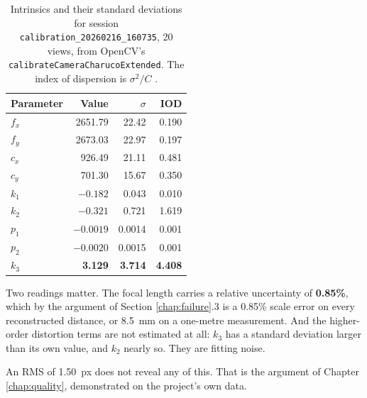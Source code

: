 \begin{table}[!ht]
\centering
\small
\caption[Measured parameter uncertainty on an archived session]{Intrinsics and their standard deviations for session \texttt{calibration\_20260216\_160735}, 20 views, from OpenCV's \texttt{calibrateCameraCharucoExtended}. The index of dispersion is $\sigma^2/C$ \cite{rojtberg2018pose}.}
\label{tab:measured-uncertainty}
\begin{tabular}{lrrr}
\toprule
\textbf{Parameter} & \textbf{Value} & \textbf{$\sigma$} & \textbf{IOD} \\
\midrule
$f_x$ & 2651.79 & 22.42 & 0.190 \\
$f_y$ & 2673.03 & 22.97 & 0.197 \\
$c_x$ & 926.49  & 21.11 & 0.481 \\
$c_y$ & 701.30  & 15.67 & 0.350 \\
$k_1$ & $-0.182$ & 0.043 & 0.010 \\
$k_2$ & $-0.321$ & 0.721 & 1.619 \\
$p_1$ & $-0.0019$ & 0.0014 & 0.001 \\
$p_2$ & $-0.0020$ & 0.0015 & 0.001 \\
$k_3$ & \textbf{3.129} & \textbf{3.714} & \textbf{4.408} \\
\bottomrule
\end{tabular}
\end{table}

Two readings matter. The focal length carries a relative uncertainty of \textbf{0.85\%}, which by the argument of Section \ref{chap:failure}.3 is a 0.85\% scale error on every reconstructed distance, or 8.5~mm on a one-metre measurement. And the higher-order distortion terms are not estimated at all: $k_3$ has a standard deviation larger than its own value, and $k_2$ nearly so. They are fitting noise.

An RMS of 1.50~px does not reveal any of this. That is the argument of Chapter \ref{chap:quality}, demonstrated on the project's own data.


